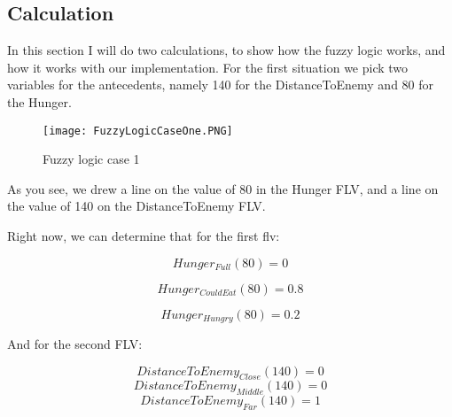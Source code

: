 \subsection{Calculation}\label{subsec:calculation}
In this section I will do two calculations, to show how the fuzzy logic works, and how it works with our implementation.
For the first situation we pick two variables for the antecedents, namely 140 for the DistanceToEnemy and 80 for the Hunger.
\begin{figure}[ht]
    \begin{center}
        \texttt{[image: FuzzyLogicCaseOne.PNG]}
    \end{center}
    \caption{Fuzzy logic case 1}
    \label{fig:FuzzyLogicCaseOne}
\end{figure}
As you see, we drew a line on the value of 80 in the Hunger FLV, and a line on the value of 140 on the DistanceToEnemy FLV\@.

Right now, we can determine that for the first flv:

\begin{equation}
    Hunger_{Full}(80) = 0
\end{equation}

\begin{equation}
                  Hunger_{CouldEat}(80) = 0.8
\end{equation}

\begin{equation}
                  Hunger_{Hungry}(80) = 0.2
\end{equation}


And for the second FLV:

\begin{equation}
    DistanceToEnemy_{Close}(140) = 0
\end{equation}
\begin{equation}
    DistanceToEnemy_{Middle}(140) = 0
\end{equation}
\begin{equation}
    DistanceToEnemy_{Far}(140) = 1
\end{equation}

